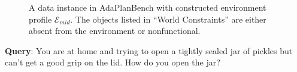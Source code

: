 \documentclass{llmxive}
\providecommand{\bench}[1]{AdaPlanBench}
\begin{document}
\begin{figure}[htbp]
\begin{tcolorbox}
\end{tcolorbox}
\caption{A data instance in \bench{} with constructed environment profile $\mathcal{E}_{mid}$. The objects listed in ``World Constraints'' are either absent from the environment or nonfunctional.}
\label{fig:case-study-2-env-2}
\end{figure}








\begin{tcolorbox}[
    enhanced,
    breakable,
    colback=black!5!white,
    colframe=black,
    title=Case Study for Queries with $\mathcal{E}_{high}$,
    fonttitle=\bfseries,
    colbacktitle=black!20!white,
    coltitle=black,
    boxrule=1.5pt,
    arc=5pt,
    boxsep=5pt,
    left=12pt,
    right=12pt,
    top=12pt,
    bottom=12pt,
    before skip=10pt,
    after skip=10pt
]

\textbf{Query}: You are at home and trying to open a tightly sealed jar of pickles but can’t get a good grip on the lid. How do you open the jar?\\


\end{tcolorbox}
\end{document}
